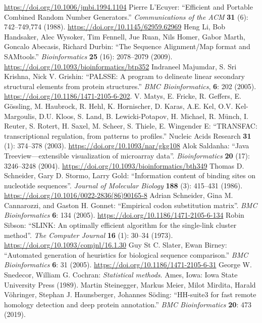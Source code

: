 \documentclass{report}
\begin{document}
\begin{thebibliography}{99}
\url{https://doi.org/10.1006/jmbi.1994.1104}
Pierre L'Ecuyer: ``Efficient and Portable Combined Random Number Generators.''
\textit{Communications of the ACM} {\bf 31} (6): 742--749,774 (1988).
\url{https://doi.org/10.1145/62959.62969}
Heng Li, Bob Handsaker, Alec Wysoker, Tim Fennell, Jue Ruan, Nils Homer, Gabor Marth, Goncalo Abecasis, Richard Durbin: ``The Sequence Alignment/Map format and SAMtools.'' \textit{Bioinformatics} {\bf 25} (16): 2078--2079 (2009).
\url{https://doi.org/10.1093/bioinformatics/btp352}
Indraneel Majumdar, S. Sri Krishna, Nick V. Grishin: ``PALSSE: A program to delineate linear secondary structural elements from protein structures.'' \textit{BMC Bioinformatics}, {\bf 6}: 202 (2005).
\url{https://doi.org/10.1186/1471-2105-6-202}.
V. Matys, E. Fricke, R. Geffers, E. G\"ossling, M. Haubrock, R. Hehl, K. Hornischer, D. Karas, A.E. Kel, O.V. Kel-Margoulis, D.U. Kloos, S. Land, B. Lewicki-Potapov, H. Michael, R. M\"unch, I. Reuter, S. Rotert, H. Saxel, M. Scheer, S. Thiele, E. Wingender E: ``TRANSFAC: transcriptional regulation, from patterns to profiles.'' Nucleic Acids Research {\bf 31} (1): 374--378 (2003).
\url{https://doi.org/10.1093/nar/gkg108}
Alok Saldanha: ``Java Treeview---extensible visualization of microarray data''. \textit{Bioinformatics} {\bf 20} (17): 3246--3248 (2004).
\url{https://doi.org/10.1093/bioinformatics/bth349}
Thomas D. Schneider, Gary D. Stormo, Larry Gold: ``Information content of binding sites on nucleotide sequences''. \textit{Journal of Molecular Biology} {\bf 188} (3): 415--431 (1986). \url{https://doi.org/10.1016/0022-2836(86)90165-8}
Adrian Schneider, Gina M. Cannarozzi, and Gaston H. Gonnet: ``Empirical codon substitution matrix''. \textit{BMC Bioinformatics} {\bf 6}: 134 (2005).
\url{https://doi.org/10.1186/1471-2105-6-134}
Robin Sibson: ``SLINK: An optimally efficient algorithm for the single-link cluster method''. \textit{The Computer Journal} {\bf 16} (1): 30--34 (1973).
\url{https://doi.org/10.1093/comjnl/16.1.30}
Guy St C. Slater, Ewan Birney: ``Automated generation of heuristics for biological sequence comparison.'' \textit{BMC Bioinformatics} {\bf 6}: 31 (2005).
\url{https://doi.org/10.1186/1471-2105-6-31}
George W. Snedecor, William G. Cochran: \textit{Statistical methods}. Ames, Iowa: Iowa State University Press (1989).
Martin Steinegger, Markus Meier, Milot Mirdita, Harald V\"ohringer, Stephan J. Haunsberger, Johannes S\"oding: ``HH-suite3 for fast remote homology detection and deep protein annotation.'' \textit{BMC Bioinformatics} {\bf 20}: 473 (2019).

\end{thebibliography}
\end{document}
